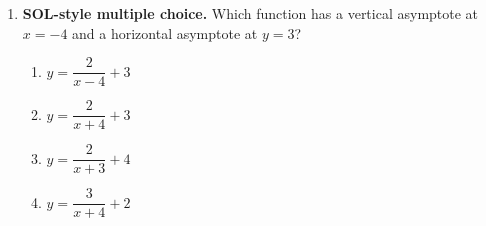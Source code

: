 \documentclass[10pt]{article}
\begin{document}
\begin{enumerate}[leftmargin=1.8em, itemsep=7pt]
\begin{center}
\begin{minipage}{0.55\linewidth}
        \vspace{3pt}
        Substitute $(3,2)$ and solve for $a$:

        \vspace{22pt}
        $a=$ \blank{1.0cm} \quad Equation: \blank{2.8cm}

        \vspace{3pt}
        Check on $(5,0)$: \blank{2.4cm}
        \end{minipage}
        \end{center}

  \item \textbf{SOL-style multiple choice.} Which function has a vertical asymptote at $x=-4$ and a
        horizontal asymptote at $y=3$?
        \begin{enumerate}[label=\Alph*., leftmargin=1.9em, itemsep=1pt]
          \item $y=\dfrac{2}{x-4}+3$
          \item $y=\dfrac{2}{x+4}+3$
          \item $y=\dfrac{2}{x+3}+4$
          \item $y=\dfrac{3}{x+4}+2$
        \end{enumerate}
\end{enumerate}
\end{document}
